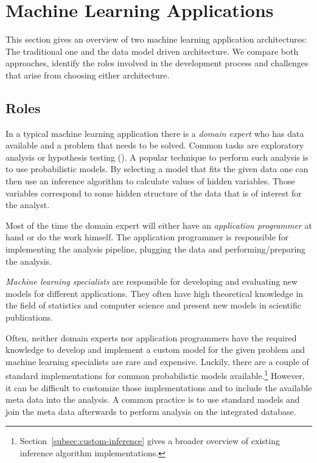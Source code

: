 \section{Machine Learning Applications}

This section gives an overview of two machine learning application architectures: The traditional one and the data model driven architecture. We compare both approaches, identify the roles involved in the development process and challenges that arise from choosing either architecture.

\subsection{Roles}

In a typical machine learning application there is a \emph{domain expert} who has data available and a problem that needs to be solved. Common tasks are exploratory analysis or hypothesis testing (\cite{tukey1980we}). A popular technique to perform such analysis is to use probabilistic models. By selecting a model that fits the given data one can then use an inference algorithm to calculate values of hidden variables. Those variables correspond to some hidden structure of the data that is of interest for the analyst.

Most of the time the domain expert will either have an \emph{application programmer} at hand or do the work himself. The application programmer is responsible for implementing the analysis pipeline, plugging the data and performing/preparing the analysis.

\emph{Machine learning specialists} are responsible for developing and evaluating new models for different applications. They often have high theoretical knowledge in the field of statistics and computer science and present new models in scientific publications.

Often, neither domain experts nor application programmers have the required knowledge to develop and implement a custom model for the given problem and machine learning specialists are rare and expensive. Luckily, there are a couple of standard implementations for common probabilistic models available.\footnote{Section~\ref{subsec:custom-inference} gives a broader overview of existing inference algorithm implementations.} However, it can be difficult to customize those implementations and to include the available meta data into the analysis. A common practice is to use standard models and join the meta data afterwards to perform analysis on the integrated database.


